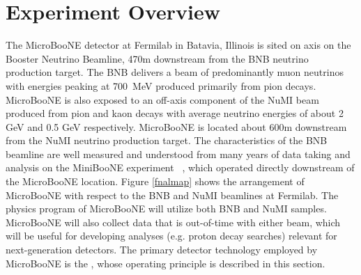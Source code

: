 \section{Experiment Overview}
\label{sec:overview}

The MicroBooNE detector at Fermilab in Batavia, Illinois is sited on axis on the Booster Neutrino Beamline, 470m downstream from the BNB neutrino production target.   The BNB delivers a beam of predominantly muon neutrinos with energies peaking at 700~MeV produced primarily from pion decays. MicroBooNE is also exposed to an off-axis component of the NuMI beam~\cite{Adamson:2015dkw} produced from pion and kaon decays with average neutrino energies of about 2 GeV and 0.5 GeV respectively.   MicroBooNE is located about 600m downstream from the NuMI neutrino production target.  The characteristics of the BNB beamline are well measured and understood from many years of data taking and analysis on the MiniBooNE experiment ~\cite{AguilarArevalo:2008-MBflux}, which operated directly downstream of the MicroBooNE location.  Figure \ref{fnalmap} shows the arrangement of MicroBooNE with respect to the BNB and NuMI beamlines at Fermilab.  The physics program of MicroBooNE will utilize both BNB and NuMI samples.  MicroBooNE will also collect data that is out-of-time with either beam, which will be useful for developing analyses (e.g. proton decay searches) relevant for next-generation detectors.  The primary detector technology employed by MicroBooNE is the \lartpc, whose operating principle is described in this section.


